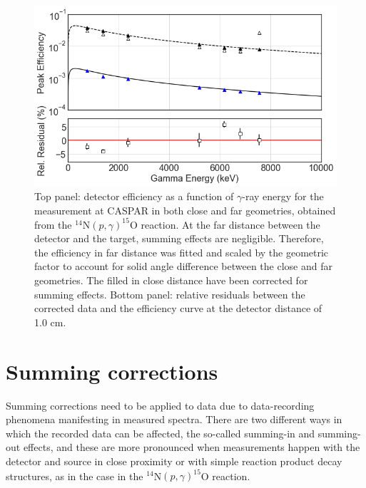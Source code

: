 \begin{figure}
\centering
\includegraphics[width=\linewidth]{figures/efficiencyAndResiduals.png}
\caption{Top panel: detector efficiency as a function of $\gamma$-ray energy for the measurement at CASPAR in both close and far geometries, obtained from the $^{14}$N$\left( p,\gamma \right) ^{15}$O reaction. At the far distance between the detector and the target, summing effects are negligible. Therefore, the efficiency in far distance was fitted and scaled by the geometric factor to account for solid angle difference between the close and far geometries. The filled in close distance have been corrected for summing effects.  Bottom panel: relative residuals between the corrected data and the efficiency curve at the detector distance of 1.0 cm.    }
\label{fig: efficiency}
\end{figure}




\section{Summing corrections}
\label{sec: summing}

Summing corrections need to be applied to data due to data-recording phenomena manifesting in measured spectra. There are two different ways in which the recorded data can be affected, the so-called summing-in and summing-out effects, and these are more pronounced when measurements happen with the detector and source in close proximity or with simple reaction product decay structures, as in the case in the $^{14}$N$\left( p,\gamma \right) ^{15}$O reaction.


